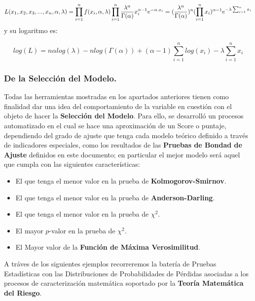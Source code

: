 \documentclass[]{article}
\providecommand{\tightlist}{%
  \setlength{\itemsep}{0pt}\setlength{\parskip}{0pt}}
\begin{document}
\[L(x_1, x_2, x_3, ..., x_n, \alpha, \lambda)=\prod_{i=1}^{n}f(x_i, \alpha, \lambda)\\ \prod_{i=1}^{n}\frac{\lambda^\alpha}{\Gamma(\alpha)}x_i^{\alpha-1}e^{-\alpha.x_i}=(\frac{\lambda^\alpha}{\Gamma(\alpha)})^n (\prod_{i=1}^{n}x_i)^{\alpha-1}e^{-\lambda\sum_{i=1}^{n} x_i} \]
y su logaritmo es:

\[log(L)=n\alpha log(\lambda)-n log(\Gamma(\alpha))+(\alpha-1)\sum_{i=1}^{n}log(x_i)-\lambda\sum_{i=1}^{n}x_i\]

\hypertarget{de-la-seleccion-del-modelo.}{%
\subsubsection{De la Selección del
Modelo.}\label{de-la-seleccion-del-modelo.}}

Todas las herramientas mostradas en los apartados anteriores tienen como
finalidad dar una idea del comportamiento de la variable en cuestión con
el objeto de hacer la \textbf{Selección del Modelo}. Para ello, se
desarrolló un procesos automatizado en el cual se hace una aproximación
de un Score o puntaje, dependiendo del grado de ajuste que tenga cada
modelo teórico definido a través de indicadores especiales, como los
resultados de las \textbf{Pruebas de Bondad de Ajuste} definidos en este
documento; en particular el mejor modelo será aquel que cumpla con las
siguientes características:

\begin{itemize}
\tightlist
\item
  El que tenga el menor valor en la prueba de
  \textbf{Kolmogorov-Smirnov}.\\
\item
  El que tenga el menor valor en la prueba de
  \textbf{Anderson-Darling}.\\
\item
  El que tenga el menor valor en la prueba de \(\chi^2\).\\
\item
  El mayor \(p\)-valor en la prueba de \(\chi^2\).\\
\item
  El Mayor valor de la \textbf{Función de Máxima Verosimilitud}.
\end{itemize}

A tráves de los siguientes ejemplos recorreremos la batería de Pruebas
Estadísticas con las Distribuciones de Probabilidades de Pérdidas
asociadas a los procesos de caracterización matemática soportado por la
\textbf{Teoría Matemática del Riesgo}.
\end{document}
